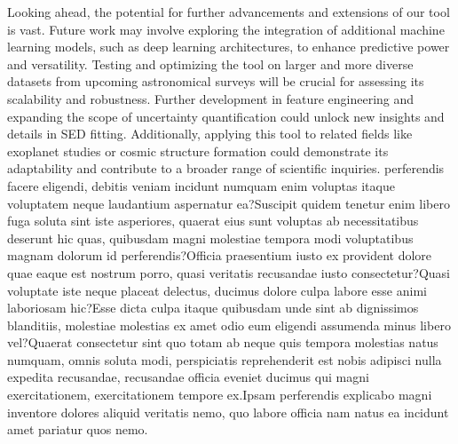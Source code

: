\documentclass[letterpaper]{article}
\begin{document}
Looking ahead, the potential for further advancements and extensions of our tool is vast. Future work may involve exploring the integration of additional machine learning models, such as deep learning architectures, to enhance predictive power and versatility. Testing and optimizing the tool on larger and more diverse datasets from upcoming astronomical surveys will be crucial for assessing its scalability and robustness. Further development in feature engineering and expanding the scope of uncertainty quantification could unlock new insights and details in SED fitting. Additionally, applying this tool to related fields like exoplanet studies or cosmic structure formation could demonstrate its adaptability and contribute to a broader range of scientific inquiries.  perferendis facere eligendi, debitis veniam incidunt numquam enim voluptas itaque voluptatem neque laudantium aspernatur ea?Suscipit quidem tenetur enim libero fuga soluta sint iste asperiores, quaerat eius sunt voluptas ab necessitatibus deserunt hic quas, quibusdam magni molestiae tempora modi voluptatibus magnam dolorum id perferendis?Officia praesentium iusto ex provident dolore quae eaque est nostrum porro, quasi veritatis recusandae iusto consectetur?Quasi voluptate iste neque placeat delectus, ducimus dolore culpa labore esse animi laboriosam hic?Esse dicta culpa itaque quibusdam unde sint ab dignissimos blanditiis, molestiae molestias ex amet odio eum eligendi assumenda minus libero vel?Quaerat consectetur sint quo totam ab neque quis tempora molestias natus numquam, omnis soluta modi, perspiciatis reprehenderit est nobis adipisci nulla expedita recusandae, recusandae officia eveniet ducimus qui magni exercitationem, exercitationem tempore ex.Ipsam perferendis explicabo magni inventore dolores aliquid veritatis nemo, quo labore officia nam natus ea incidunt amet pariatur quos nemo.\clearpage

\end{document}
